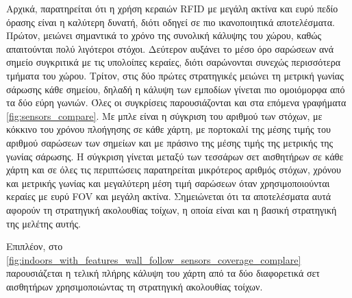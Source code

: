 Αρχικά, παρατηρείται ότι η χρήση κεραιών RFID με μεγάλη ακτίνα και ευρύ πεδίο όρασης είναι η καλύτερη δυνατή, διότι οδηγεί σε πιο ικανοποιητικά αποτελέσματα. Πρώτον, μειώνει σημαντικά το χρόνο της συνολική κάλυψης του χώρου, καθώς απαιτούνται πολύ λιγότεροι στόχοι. Δεύτερον αυξάνει το μέσο όρο σαρώσεων ανά σημείο συγκριτικά με τις υπολοίπες κεραίες, διότι σαρώνονται συνεχώς περισσότερα τμήματα του χώρου. Τρίτον, στις δύο πρώτες στρατηγικές μειώνει τη μετρική γωνίας σάρωσης κάθε σημείου, δηλαδή η κάλυψη των εμποδίων γίνεται πιο ομοιόμορφα από τα δύο εύρη γωνιών. Όλες οι συγκρίσεις παρουσιάζονται και στα επόμενα γραφήματα \ref{fig:sensors_compare}. Με μπλε είναι η σύγκριση του αριθμού των στόχων, με κόκκινο του χρόνου πλοήγησης σε κάθε χάρτη, με πορτοκαλί της μέσης τιμής του αριθμού σαρώσεων των σημείων και με πράσινο της μέσης τιμής της μετρικής της γωνίας σάρωσης. Η σύγκριση γίνεται μεταξύ των τεσσάρων σετ αισθητήρων σε κάθε χάρτη και σε όλες τις περιπτώσεις παρατηρείται μικρότερος αριθμός στόχων, χρόνου και μετρικής γωνίας και μεγαλύτερη μέση τιμή σαρώσεων όταν χρησιμοποιούνται κεραίες με ευρύ FOV και μεγάλη ακτίνα. Σημειώνεται ότι τα αποτελέσματα αυτά αφορούν τη στρατηγική ακολουθίας τοίχων, η οποία είναι και η βασική στρατηγική της μελέτης αυτής. 

Επιπλέον, στο \autoref{fig:indoors_with_features_wall_follow_sensors_coverage_complare} παρουσιάζεται η τελική πλήρης κάλυψη του χάρτη από τα δύο διαφορετικά σετ αισθητήρων χρησιμοποιώντας τη στρατηγική ακολουθίας τοίχων.


